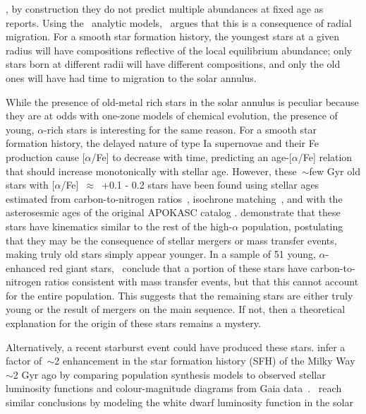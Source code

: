 \documentclass[fleqn, usenatbib]{mnras}
\begin{document}
\citep{Johnson2020}, by construction they do not predict multiple abundances at 
fixed age as~\citet{Feuillet2018} reports. Using the~\citet{Weinberg2017} 
analytic models,~\citet{Feuillet2018} argues that this is a consequence of 
radial migration. For a smooth star formation history, the youngest stars at a 
given radius will have compositions reflective of the local equilibrium 
abundance; only stars born at different radii will have different compositions, 
and only the old ones will have had time to migration to the solar annulus. 
\par 
While the presence of old-metal rich stars in the solar annulus is peculiar 
because they are at odds with one-zone models of chemical evolution, the 
presence of young, $\alpha$-rich stars is interesting for the same reason. 
For a smooth star formation history, the delayed nature of type Ia supernovae 
and their Fe production cause [$\alpha$/Fe] to decrease with time, predicting 
an age-[$\alpha$/Fe] relation that should increase monotonically with stellar 
age. However, these~$\sim$few Gyr old stars with [$\alpha$/Fe]~$\approx$~+0.1 - 
0.2 stars have been found using stellar ages estimated from carbon-to-nitrogen 
ratios~\citep{Martig2016}, isochrone matching~\citep{Feuillet2018, 
Feuillet2019}, and with the asterosesmic ages of the original APOKASC catalog 
\citep{Chiappini2015, SilvaAguirre2018, Pinsonneault2014}. 
\citet{SilvaAguirre2018} demonstrate that these stars have kinematics similar 
to the rest of the high-$\alpha$ population, postulating that they may be 
the consequence of stellar mergers or mass transfer events, making truly old 
stars simply appear younger. In a sample of 51 young, $\alpha$-enhanced red 
giant stars,~\citet{Hekker2019} conclude that a portion of these stars have 
carbon-to-nitrogen ratios consistent with mass transfer events, but that this 
cannot account for the entire population. This suggests that the remaining 
stars are either truly young or the result of mergers on the main sequence. 
If not, then a theoretical explanation for the origin of these stars remains 
a mystery. 
\par 
Alternatively, a recent starburst event could have produced these stars. 
\citet{Mor2019} infer a factor of~$\sim$2 enhancement in the star formation 
history (SFH) of the Milky Way~$\sim$2 Gyr ago by comparing population 
synthesis models to observed stellar luminosity functions and colour-magnitude 
diagrams from Gaia data~\citep{GaiaDR2}.~\citet{Isern2019} reach similar 
conclusions by modeling the white dwarf luminosity function in the solar 
\end{document}
